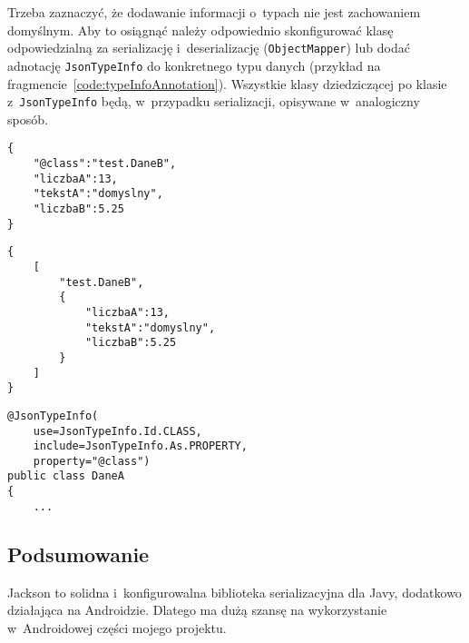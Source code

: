 \begin{description}
Trzeba zaznaczyć, że dodawanie informacji o~typach nie jest zachowaniem domyślnym. Aby to osiągnąć należy odpowiednio skonfigurować klasę odpowiedzialną za serializację i~deserializację (\texttt{ObjectMapper}) lub dodać adnotację \texttt{JsonTypeInfo} do konkretnego typu danych (przykład na fragmencie~\ref{code:typeInfoAnnotation}). Wszystkie klasy dziedziczącej po klasie z~\texttt{JsonTypeInfo} będą, w~przypadku serializacji, opisywane w~analogiczny sposób.

\begin{lstlisting}[float, frame=single, caption={Oznaczanie typu przez dodatkowe pole.}, label=code:typeInfoField]
{
    "@class":"test.DaneB",
    "liczbaA":13,
    "tekstA":"domyslny",
    "liczbaB":5.25
}
\end{lstlisting}

\begin{lstlisting}[float, frame=single, caption={Oznaczanie typu przez owinięcie w~tablicę i~dodanie do niej elementu.}, label=code:typeInfoArray]
{
    [
        "test.DaneB",
        {
            "liczbaA":13,
            "tekstA":"domyslny",
            "liczbaB":5.25
        }
    ]
}
\end{lstlisting}

\begin{lstlisting}[float, frame=single, caption={Parametryzacja przekazywania informacji o~typie w~definicji klasy.}, label=code:typeInfoAnnotation]
@JsonTypeInfo(
    use=JsonTypeInfo.Id.CLASS,
    include=JsonTypeInfo.As.PROPERTY,
    property="@class")
public class DaneA
{
    ...
\end{lstlisting}
\end{description}

\subsection{Podsumowanie}
Jackson to solidna i~konfigurowalna biblioteka serializacyjna dla Javy, dodatkowo działająca na Androidzie.
Dlatego ma dużą szansę na wykorzystanie w~Androidowej części mojego projektu.

